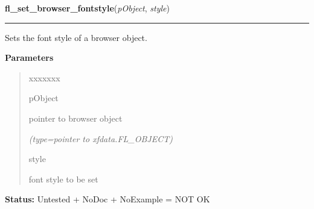 \hspace{.8\funcindent}\begin{boxedminipage}{\funcwidth}

    \raggedright \textbf{fl\_set\_browser\_fontstyle}(\textit{pObject}, \textit{style})

    \vspace{-1.5ex}

    \rule{\textwidth}{0.5\fboxrule}
\setlength{\parskip}{2ex}
    Sets the font style of a browser object.

\setlength{\parskip}{1ex}
      \textbf{Parameters}
      \vspace{-1ex}

      \begin{quote}
        \begin{Ventry}{xxxxxxx}

          \item[pObject]

          pointer to browser object

            {\it (type=pointer to xfdata.FL\_OBJECT)}

          \item[style]

          font style to be set

        \end{Ventry}

      \end{quote}

\textbf{Status:} Untested + NoDoc + NoExample = NOT OK



    \end{boxedminipage}

    \label{xformslib:library:fl_set_browser_specialkey}

    \vspace{0.5ex}

